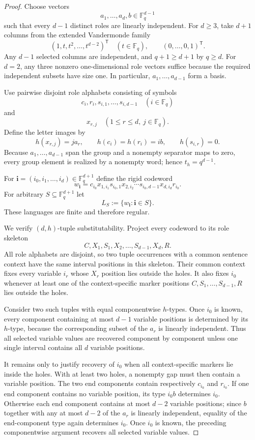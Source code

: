 \documentclass[11pt]{article}
\begin{document}
\begin{proof}
Choose vectors
\[
a_1,\ldots,a_d,b\in\mathbb F_q^{d-1}
\]
such that every \(d-1\) distinct roles are linearly independent.  For
\(d\ge3\), take \(d+1\) columns from the extended Vandermonde family
\[
 (1,t,t^2,\ldots,t^{d-2})^{\mathsf T}\quad(t\in\mathbb F_q),
 \qquad
 (0,\ldots,0,1)^{\mathsf T}.
\]
Any \(d-1\) selected columns are independent, and \(q+1\ge d+1\) by
\(q\ge d\).  For \(d=2\), any three nonzero one-dimensional role vectors
suffice because the required independent subsets have size one.
In particular, \(a_1,\ldots,a_{d-1}\) form a basis.

Use pairwise disjoint role alphabets consisting of symbols
\[
c_i,r_i,s_{i,1},\ldots,s_{i,d-1}\quad(i\in\mathbb F_q)
\]
and
\[
x_{r,j}\quad(1\le r\le d,\ j\in\mathbb F_q).
\]
Define the letter images by
\[
h(x_{r,j})=j a_r,\qquad
h(c_i)=h(r_i)=i b,\qquad
h(s_{i,r})=0.
\]
Because \(a_1,\ldots,a_{d-1}\) span the group and a nonempty separator maps to
zero, every group element is realized by a nonempty word; hence
\(t_h=q^{d-1}\).

For
\(\mathbf i=(i_0,i_1,\ldots,i_d)\in\mathbb F_q^{d+1}\) define the rigid codeword
\[
w_{\mathbf i}
=c_{i_0}x_{1,i_1}s_{i_0,1}x_{2,i_2}\cdots
s_{i_0,d-1}x_{d,i_d}r_{i_0}.
\]
For arbitrary \(S\subseteq\mathbb F_q^{d+1}\) let
\[
L_S:=\{w_{\mathbf i}:\mathbf i\in S\}.
\]
These languages are finite and therefore regular.

We verify \((d,h)\)-tuple substitutability. Project every codeword to its
role skeleton
\[
C,X_1,S_1,X_2,\ldots,S_{d-1},X_d,R.
\]
All role alphabets are disjoint, so two tuple occurrences with a common
sentence context have the same interval positions in this skeleton. Their
common context fixes every variable \(i_r\) whose \(X_r\) position lies outside
the holes. It also fixes \(i_0\) whenever at least one of the context-specific
marker positions \(C,S_1,\ldots,S_{d-1},R\) lies outside the holes.

Consider two such tuples with equal componentwise \(h\)-types. Once \(i_0\)
is known, every component containing at most \(d-1\) variable positions is
determined by its \(h\)-type, because the corresponding subset of the
\(a_r\) is linearly independent. Thus all selected variable values are
recovered component by component unless one single interval contains all
\(d\) variable positions.

It remains only to justify recovery of \(i_0\) when all context-specific markers
lie inside the holes. With at least two holes, a nonempty gap must then
contain a variable position. The two end components contain respectively
\(c_{i_0}\) and \(r_{i_0}\). If one end component contains no variable position,
its type \(i_0b\) determines \(i_0\). Otherwise each end component contains at
most \(d-2\) variable positions; since \(b\) together with any at most \(d-2\) of
the \(a_r\) is linearly independent, equality of the end-component type again
determines \(i_0\). Once \(i_0\) is known, the preceding componentwise argument
recovers all selected variable values.


\end{proof}
\end{document}
